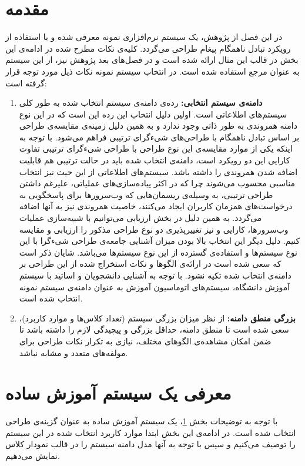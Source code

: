 \section{مقدمه}
\label{sectio:design:preface}
در این فصل از پژوهش، یک سیستم نرم‌افزاری نمونه معرفی شده و با استفاده از رویکرد تبادل ناهمگام پیغام طراحی می‌گردد. کلیه‌ی نکات مطرح شده در ادامه‌ی این بخش در قالب این مثال ارائه شده است و در فصل‌های بعد پژوهش نیز، از این سیستم به عنوان مرجع استفاده شده است.
در انتخاب سیستم نمونه نکات ذیل مورد توجه قرار گرفته‌ است:
\begin{enumerate}
\item \textbf{دامنه‌ی سیستم انتخابی:}
رده‌ی دامنه‌ی سیستم انتخاب شده به طور کلی سیستم‌های اطلاعاتی است. اولین دلیل انتخاب این رده این است که در این نوع دامنه همروندی به طور ذاتی وجود ندارد و به همین دلیل زمینه‌ی مقایسه‌ی طراحی بر اساس تبادل ناهمگام با  طراحی‌های شیءگرای ترتیبی فراهم می‌شود. با توجه به اینکه یکی از موارد مقایسه‌ی این نوع طراحی با طراحی شیءگرای ترتیبی تفاوت کارایی این دو رویکرد است، دامنه‌ی انتخاب شده باید در حالت ترتیبی هم قابلیت اضافه شدن همروندی را داشته باشد. سیستم‌های اطلاعاتی از این حیث نیز انتخاب مناسبی محسوب می‌شوند چرا که در اکثر پیاده‌سازی‌های عملیاتی، علیرغم داشتن طراحی ترتیبی، به وسیله‌ی ریسمان‌هایی که وب‌سرورها برای پاسخگویی به درخواست‌های همزمان کاربران ایجاد می‌کنند، خاصیت همروندی نیز به آنها اضافه می‌گردد. به همین دلیل در بخش ارزیابی می‌توانیم با شبیه‌سازی عملیات وب‌سرورها، کارایی و نیز تغییرپذیری دو نوع طراحی مذکور را ارزیابی و مقایسه کنیم.
 دلیل دیگر این انتخاب بالا بودن میزان آشنایی جامعه‌ی طراحی شیءگرا با این نوع سیستم‌ها و استفاده‌ی گسترده از این نوع سیستم‌ها می‌باشد. شایان ذکر است که سعی شده است در ارائه‌ی الگوها و نکات استخراج شده از این طراحی بر دامنه‌ی انتخاب شده تکیه‌ نشود. با توجه به آشنایی دانشجویان و اساتید با سیستم آموزش دانشگاه، سیستم‌های اتوماسیون آموزش به عنوان دامنه‌ی سیستم نمونه انتخاب شده است. 
\item \textbf{ بزرگی منطق دامنه:}
از نظر میزان بزرگی سیستم (تعداد کلاس‌ها و موارد کاربرد)،‌  سعی شده است تا منطق دامنه، حداقل بزرگی و پیچیدگی لازم را داشته باشد تا ضمن امکان مشاهده‌ی الگوهای مختلف، نیازی به تکرار نکات طراحی برای مولفه‌های متعدد و مشابه نباشد. 
\end{enumerate} 

\section{معرفی یک سیستم آموزش ساده }
\label{section:eduIntro}
با توجه به توضیحات بخش \ref{sectio:design:preface}،‌ یک سیستم آموزش ساده به عنوان گزینه‌ی طراحی انتخاب شده است. در ادامه‌ی این بخش ابتدا موارد کاربرد انتخاب شده در این سیستم را توصیف می‌کنیم و سپس با توجه به‌ آنها مدل دامنه سیستم را در قالب نمودار کلاس نمایش می‌دهیم.

